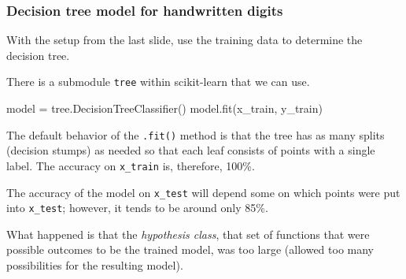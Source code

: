 \documentclass[smaller]{beamer}
\newenvironment{codeblock}
    {\hfill\begin{beamerboxesrounded}[lower=codecol, width=0.8\textwidth]
    \medskip

    }
    { 
    \end{beamerboxesrounded}\hfill
    }
\theoremstyle{example}
\newcommand{\ttt}[1]{{\small\texttt{#1}}}
\begin{document}
\begin{frame}[fragile]
    \frametitle{Decision tree model for handwritten digits}
With the setup from the last slide, use the training data to determine the decision tree.

There is a submodule \lstinline[language=Python,stringstyle=\ttfamily]{tree} within scikit-learn that we can use.

\begin{codeblock}

\begin{python}
model = tree.DecisionTreeClassifier()
model.fit(x_train, y_train)
\end{python}

\end{codeblock}

The default behavior of the \ttt{.fit()} method is that the tree has as many splits (decision stumps) as needed so that each leaf consists of points with a single label. The accuracy on \lstinline[language=Python,stringstyle=\ttfamily]{x_train} is, therefore, 100\%. 

The accuracy of the model on \lstinline[language=Python,stringstyle=\ttfamily]{x_test} will depend some on which points were put into \lstinline[language=Python,stringstyle=\ttfamily]{x_test}; however, it tends to be around only 85\%.

What happened is that the \textit{hypothesis class}, that set of functions that were possible outcomes to be the trained model, was too large (allowed too many possibilities for the resulting model). 
\end{frame}
\end{document}
